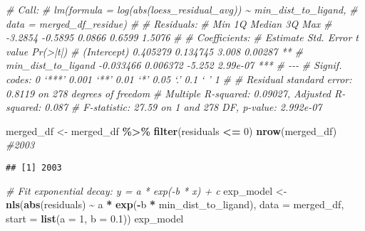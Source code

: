 \documentclass[
]{article}
\newenvironment{Shaded}{\begin{snugshade}}{\end{snugshade}}
\newcommand{\AttributeTok}[1]{\textcolor[rgb]{0.13,0.29,0.53}{#1}}
\newcommand{\CommentTok}[1]{\textcolor[rgb]{0.56,0.35,0.01}{\textit{#1}}}
\newcommand{\DecValTok}[1]{\textcolor[rgb]{0.00,0.00,0.81}{#1}}
\newcommand{\FloatTok}[1]{\textcolor[rgb]{0.00,0.00,0.81}{#1}}
\newcommand{\FunctionTok}[1]{\textcolor[rgb]{0.13,0.29,0.53}{\textbf{#1}}}
\newcommand{\NormalTok}[1]{#1}
\newcommand{\OtherTok}[1]{\textcolor[rgb]{0.56,0.35,0.01}{#1}}
\newcommand{\SpecialCharTok}[1]{\textcolor[rgb]{0.81,0.36,0.00}{\textbf{#1}}}
\begin{document}
\begin{Shaded}
\begin{Highlighting}[]
\CommentTok{\# Call:}
\CommentTok{\# lm(formula = log(abs(loess\_residual\_avg)) \textasciitilde{} min\_dist\_to\_ligand, }
\CommentTok{\#     data = merged\_df\_residue)}
\CommentTok{\# }
\CommentTok{\# Residuals:}
\CommentTok{\#     Min      1Q  Median      3Q     Max }
\CommentTok{\# {-}3.2854 {-}0.5895  0.0866  0.6599  1.5076 }
\CommentTok{\# }
\CommentTok{\# Coefficients:}
\CommentTok{\#                     Estimate Std. Error t value Pr(\textgreater{}|t|)    }
\CommentTok{\# (Intercept)         0.405279   0.134745   3.008  0.00287 ** }
\CommentTok{\# min\_dist\_to\_ligand {-}0.033466   0.006372  {-}5.252 2.99e{-}07 ***}
\CommentTok{\# {-}{-}{-}}
\CommentTok{\# Signif. codes:  0 ‘***’ 0.001 ‘**’ 0.01 ‘*’ 0.05 ‘.’ 0.1 ‘ ’ 1}
\CommentTok{\# }
\CommentTok{\# Residual standard error: 0.8119 on 278 degrees of freedom}
\CommentTok{\# Multiple R{-}squared:  0.09027, Adjusted R{-}squared:  0.087 }
\CommentTok{\# F{-}statistic: 27.59 on 1 and 278 DF,  p{-}value: 2.992e{-}07}
\end{Highlighting}
\end{Shaded}

\begin{Shaded}
\begin{Highlighting}[]
\NormalTok{merged\_df }\OtherTok{\textless{}{-}}\NormalTok{ merged\_df }\SpecialCharTok{\%\textgreater{}\%} \FunctionTok{filter}\NormalTok{(residuals }\SpecialCharTok{\textless{}=} \DecValTok{0}\NormalTok{)}
\FunctionTok{nrow}\NormalTok{(merged\_df) }\CommentTok{\#2003}
\end{Highlighting}
\end{Shaded}

\begin{verbatim}
## [1] 2003
\end{verbatim}

\begin{Shaded}
\begin{Highlighting}[]
\CommentTok{\# Fit exponential decay: y = a * exp({-}b * x) + c}
\NormalTok{exp\_model }\OtherTok{\textless{}{-}} \FunctionTok{nls}\NormalTok{(}\FunctionTok{abs}\NormalTok{(residuals) }\SpecialCharTok{\textasciitilde{}}\NormalTok{ a }\SpecialCharTok{*} \FunctionTok{exp}\NormalTok{(}\SpecialCharTok{{-}}\NormalTok{b }\SpecialCharTok{*}\NormalTok{ min\_dist\_to\_ligand),}
                 \AttributeTok{data =}\NormalTok{ merged\_df,}
                 \AttributeTok{start =} \FunctionTok{list}\NormalTok{(}\AttributeTok{a =} \DecValTok{1}\NormalTok{, }\AttributeTok{b =} \FloatTok{0.1}\NormalTok{))}
\NormalTok{exp\_model}
\end{Highlighting}
\end{Shaded}
\end{document}
